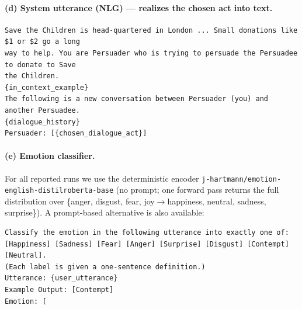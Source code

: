 \paragraph{(d) System utterance (NLG) --- realizes the chosen act into text.}
\begin{lstlisting}[style=prompt]
Save the Children is head-quartered in London ... Small donations like $1 or $2 go a long
way to help. You are Persuader who is trying to persuade the Persuadee to donate to Save
the Children.
{in_context_example}
The following is a new conversation between Persuader (you) and another Persuadee.
{dialogue_history}
Persuader: [{chosen_dialogue_act}]
\end{lstlisting}

\paragraph{(e) Emotion classifier.}
For all reported runs we use the deterministic encoder
\texttt{j-hartmann/emotion-english-distilroberta-base} (no prompt; one forward pass returns the
full distribution over \{anger, disgust, fear, joy$\rightarrow$happiness, neutral, sadness,
surprise\}). A prompt-based alternative is also available:
\begin{lstlisting}[style=prompt]
Classify the emotion in the following utterance into exactly one of:
[Happiness] [Sadness] [Fear] [Anger] [Surprise] [Disgust] [Contempt] [Neutral].
(Each label is given a one-sentence definition.)
Utterance: {user_utterance}
Example Output: [Contempt]
Emotion: [
\end{lstlisting}
